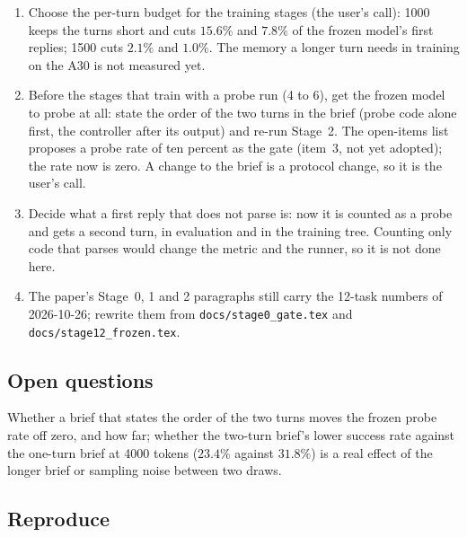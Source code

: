 \documentclass[11pt,a4paper]{article}
\begin{document}
\begin{enumerate}[nosep]
\item Choose the per-turn budget for the training stages (the user's call):
  1000 keeps the turns short and cuts $15.6\%$ and $7.8\%$ of the frozen
  model's first replies; 1500 cuts $2.1\%$ and $1.0\%$. The memory a longer
  turn needs in training on the A30 is not measured yet.
\item Before the stages that train with a probe run (4 to 6), get the frozen
  model to probe at all: state the order of the two turns in the brief
  (probe code alone first, the controller after its output) and re-run
  Stage~2. The open-items list proposes a probe rate of ten percent as the
  gate (item~3, not yet adopted); the rate now is zero. A change to the
  brief is a protocol change, so it is the user's call.
\item Decide what a first reply that does not parse is: now it is counted as
  a probe and gets a second turn, in evaluation and in the training tree.
  Counting only code that parses would change the metric and the runner, so
  it is not done here.
\item The paper's Stage~0, 1 and 2 paragraphs still carry the 12-task
  numbers of 2026-10-26; rewrite them from \texttt{docs/stage0\_gate.tex}
  and \texttt{docs/stage12\_frozen.tex}.
\end{enumerate}

\subsection*{Open questions}

Whether a brief that states the order of the two turns moves the frozen
probe rate off zero, and how far; whether the two-turn brief's lower success
rate against the one-turn brief at 4000 tokens ($23.4\%$ against $31.8\%$)
is a real effect of the longer brief or sampling noise between two draws.

\subsection*{Reproduce}
\end{document}
